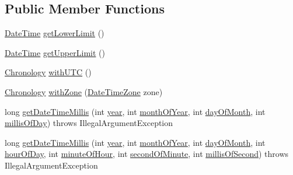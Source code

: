 \subsection*{Public Member Functions}
\begin{DoxyCompactItemize}
\item 
\hyperlink{classorg_1_1joda_1_1time_1_1_date_time}{Date\-Time} \hyperlink{classorg_1_1joda_1_1time_1_1chrono_1_1_limit_chronology_a636a30555f7c89466dc93225e111181b}{get\-Lower\-Limit} ()
\item 
\hyperlink{classorg_1_1joda_1_1time_1_1_date_time}{Date\-Time} \hyperlink{classorg_1_1joda_1_1time_1_1chrono_1_1_limit_chronology_a16e0770a3bdca3e76ff8b880dc7cf55a}{get\-Upper\-Limit} ()
\item 
\hyperlink{classorg_1_1joda_1_1time_1_1_chronology}{Chronology} \hyperlink{classorg_1_1joda_1_1time_1_1chrono_1_1_limit_chronology_a00f3af557e93d287883f7816097c9aff}{with\-U\-T\-C} ()
\item 
\hyperlink{classorg_1_1joda_1_1time_1_1_chronology}{Chronology} \hyperlink{classorg_1_1joda_1_1time_1_1chrono_1_1_limit_chronology_a1bf129c988007fb617433ab45908a949}{with\-Zone} (\hyperlink{classorg_1_1joda_1_1time_1_1_date_time_zone}{Date\-Time\-Zone} zone)
\item 
long \hyperlink{classorg_1_1joda_1_1time_1_1chrono_1_1_limit_chronology_a80d14dd8f8c92f98d1f83ee66b2fad62}{get\-Date\-Time\-Millis} (int \hyperlink{classorg_1_1joda_1_1time_1_1chrono_1_1_assembled_chronology_aa1e3d4efcbe5275257c7815e4816561a}{year}, int \hyperlink{classorg_1_1joda_1_1time_1_1chrono_1_1_assembled_chronology_a838ab0bb1ded0d1dc6d53f307297c58c}{month\-Of\-Year}, int \hyperlink{classorg_1_1joda_1_1time_1_1chrono_1_1_assembled_chronology_a6aa5f9a31841b1ffa448660d36967f92}{day\-Of\-Month}, int \hyperlink{classorg_1_1joda_1_1time_1_1chrono_1_1_assembled_chronology_afccb0dba308d68f09089bff55f2849ed}{millis\-Of\-Day})  throws Illegal\-Argument\-Exception     
\item 
long \hyperlink{classorg_1_1joda_1_1time_1_1chrono_1_1_limit_chronology_acdc72b6be48bc857ac5e7a00ebc092fe}{get\-Date\-Time\-Millis} (int \hyperlink{classorg_1_1joda_1_1time_1_1chrono_1_1_assembled_chronology_aa1e3d4efcbe5275257c7815e4816561a}{year}, int \hyperlink{classorg_1_1joda_1_1time_1_1chrono_1_1_assembled_chronology_a838ab0bb1ded0d1dc6d53f307297c58c}{month\-Of\-Year}, int \hyperlink{classorg_1_1joda_1_1time_1_1chrono_1_1_assembled_chronology_a6aa5f9a31841b1ffa448660d36967f92}{day\-Of\-Month}, int \hyperlink{classorg_1_1joda_1_1time_1_1chrono_1_1_assembled_chronology_a7bb60a080dea96b8103a530f88a4fb54}{hour\-Of\-Day}, int \hyperlink{classorg_1_1joda_1_1time_1_1chrono_1_1_assembled_chronology_afae2a5fd2073af85a1d2008d98313da7}{minute\-Of\-Hour}, int \hyperlink{classorg_1_1joda_1_1time_1_1chrono_1_1_assembled_chronology_adc867c7197cd2ae0d480003d22d9fdb7}{second\-Of\-Minute}, int \hyperlink{classorg_1_1joda_1_1time_1_1chrono_1_1_assembled_chronology_a16f1e731a421127a787ac71ffded4387}{millis\-Of\-Second})  throws Illegal\-Argument\-Exception     

\end{DoxyCompactItemize}

